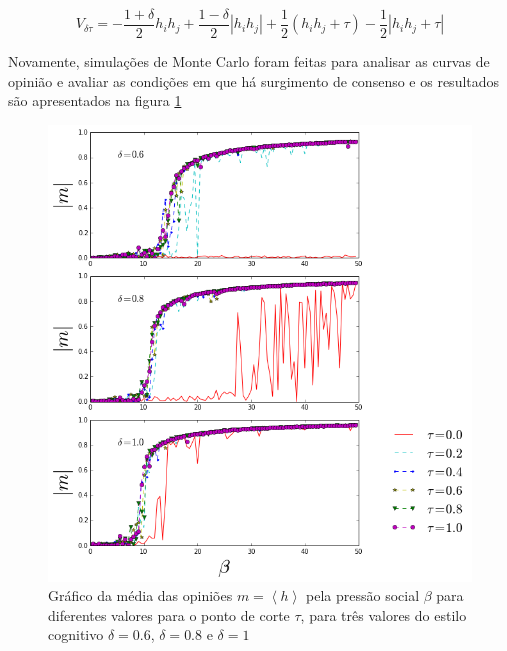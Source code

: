 \documentclass[11pt]{article}
\begin{document}
\[V_{\delta \tau}=-\frac{1+\delta}{2}h_ih_j+\frac{1-\delta}{2}|h_ih_j|+
              \frac{1}{2}(h_ih_j+\tau)-\frac{1}{2}|h_ih_j+\tau|
\]

Novamente, simulações de Monte Carlo foram feitas para analisar as curvas de
opinião e avaliar as condições em que há surgimento de consenso e os resultados
são apresentados na figura  \ref{m-b-t-3d}


\begin{figure}[h!]
  \centering
      \includegraphics[width=1.0\textwidth]{mag-beta-tau-3-deltas.png}
  \caption{Gráfico da média das opiniões $m=\left<h\right>$ pela pressão social
      $\beta$ para diferentes valores para o ponto de corte $\tau$, para três
      valores do 
  estilo cognitivo $\delta=0.6$, $\delta=0.8$ e $\delta=1$}
    \label{m-b-t-3d}
\end{figure}
\end{document}
